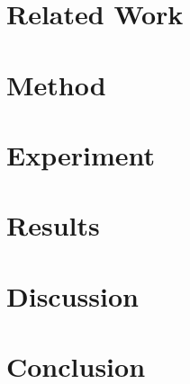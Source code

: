 \documentclass[11pt]{article}
\begin{document}
\section{Related Work}
\citet{meyer2023anonymizing}

\section{Method}

\section{Experiment}

\section{Results}

\section{Discussion}

\section{Conclusion}



\appendix
\end{document}
